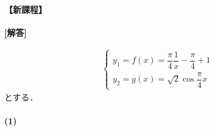\documentclass[../../main.tex]{subfiles}
\begin{document}
\begin{oframed}
  
\end{oframed}

\paragraph{【新課程】}

{\bf [解答]}

\begin{align}
  \begin{cases}
    y_1 = f(x) = \dfrac{\pi}{4}\dfrac{1}{x} - \dfrac{\pi}{4} + 1 \\
    y_2 = g(x) = \sqrt{2}\cos \dfrac{\pi}{4}x
  \end{cases} \label{eq:1}
\end{align}
とする．

\paragraph{(1)}
\end{document}
